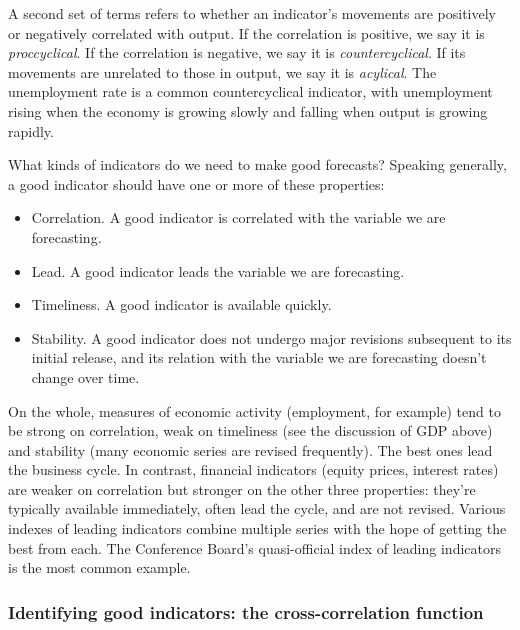 \documentclass[letterpaper,12pt]{article}
\begin{document}
A second set of terms refers to whether an indicator's movements
are positively or negatively correlated with output.
If the correlation is positive, we say it is {\it proccyclical\/}.
If the correlation is negative, we say it is {\it countercyclical\/}.
If its movements are unrelated to those in output, 
we say it is {\it acylical\/}.  
The unemployment rate is a common countercyclical indicator, 
with unemployment rising when the economy is growing slowly 
and falling when output is growing rapidly.  



What kinds of indicators do we need to make good forecasts?  
Speaking generally, 
a good indicator should have one or more of these properties:
%
\begin{itemize}

\item Correlation.  A good indicator is correlated with the
variable we are forecasting.

\item Lead. A good indicator leads the variable we are
forecasting.

\item Timeliness.  A good indicator is available quickly.

\item Stability.  A good indicator does not undergo major
revisions subsequent to its initial release, and its
relation with the variable we are forecasting doesn't
change over time.

\end{itemize}
On the whole, measures of economic activity 
(employment, for example) 
tend to be strong on correlation, weak on timeliness (see the
discussion of GDP above) and stability (many economic series are
revised frequently).  The best ones lead the business cycle.  In
contrast, financial indicators (equity prices, interest rates) are
weaker on correlation but stronger on the other three properties:
they're typically available immediately, often lead the cycle, and
are not revised. 
Various indexes of leading indicators combine multiple series with the
hope of getting the best from each.  The Conference Board's
quasi-official index of leading indicators is the most common example. 


\subsubsection*{Identifying good indicators: the cross-correlation function}
\end{document}
